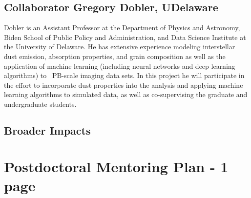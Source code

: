\documentclass{proposalnsf}
\begin{document}
\subsection{Collaborator Gregory Dobler, UDelaware}
Dobler is an Assistant Professor at the Department of Physics and Astronomy, Biden School of Public Policy and Administration, and Data Science Institute at the University of Delaware.  He has extensive experience modeling interstellar dust emission, absorption properties, and grain composition as well as the application of machine learning (including neural networks and deep learning algorithms) to ~PB-scale imaging data sets.  In this project he will participate in the effort to incorporate dust properties into the analysis and applying machine learning algorithms to simulated data, as well as co-supervising the graduate and undergraduate students.

\subsection{Broader Impacts}


\clearpage
{}
\clearpage
\section{Postdoctoral Mentoring Plan - 1 page}



\clearpage


\newpage
{}
\renewcommand{\thepage} {E--\arabic{page}}




\newpage
{}
\renewcommand{\thepage} {G--\arabic{page}}
\end{document}

